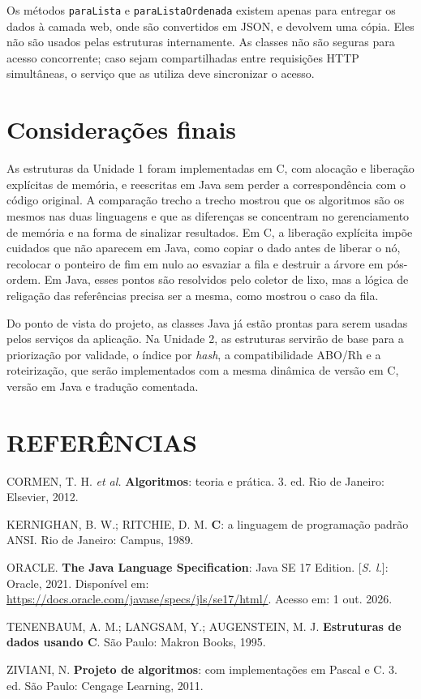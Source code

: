 \documentclass[12pt,a4paper,oneside]{report}
\newcommand{\cod}[1]{\texttt{#1}}
\begin{document}
Os métodos \cod{paraLista} e \cod{paraListaOrdenada} existem apenas para entregar os dados à camada web, onde são convertidos em JSON, e devolvem uma cópia. Eles não são usados pelas estruturas internamente. As classes não são seguras para acesso concorrente; caso sejam compartilhadas entre requisições HTTP simultâneas, o serviço que as utiliza deve sincronizar o acesso.

\chapter{Considerações finais}

As estruturas da Unidade 1 foram implementadas em C, com alocação e liberação explícitas de memória, e reescritas em Java sem perder a correspondência com o código original. A comparação trecho a trecho mostrou que os algoritmos são os mesmos nas duas linguagens e que as diferenças se concentram no gerenciamento de memória e na forma de sinalizar resultados. Em C, a liberação explícita impõe cuidados que não aparecem em Java, como copiar o dado antes de liberar o nó, recolocar o ponteiro de fim em nulo ao esvaziar a fila e destruir a árvore em pós-ordem. Em Java, esses pontos são resolvidos pelo coletor de lixo, mas a lógica de religação das referências precisa ser a mesma, como mostrou o caso da fila.

Do ponto de vista do projeto, as classes Java já estão prontas para serem usadas pelos serviços da aplicação. Na Unidade 2, as estruturas servirão de base para a priorização por validade, o índice por \textit{hash}, a compatibilidade ABO/Rh e a roteirização, que serão implementados com a mesma dinâmica de versão em C, versão em Java e tradução comentada.

\chapter*{REFERÊNCIAS}
\begin{singlespace}
\setlength{\parindent}{0pt}
\setlength{\parskip}{12pt}
\raggedright

CORMEN, T. H. \textit{et al.} \textbf{Algoritmos}: teoria e prática. 3. ed. Rio de Janeiro: Elsevier, 2012.

KERNIGHAN, B. W.; RITCHIE, D. M. \textbf{C}: a linguagem de programação padrão ANSI. Rio de Janeiro: Campus, 1989.

ORACLE. \textbf{The Java Language Specification}: Java SE 17 Edition. [\textit{S. l.}]: Oracle, 2021. Disponível em: \url{https://docs.oracle.com/javase/specs/jls/se17/html/}. Acesso em: 1 out. 2026.

TENENBAUM, A. M.; LANGSAM, Y.; AUGENSTEIN, M. J. \textbf{Estruturas de dados usando C}. São Paulo: Makron Books, 1995.

ZIVIANI, N. \textbf{Projeto de algoritmos}: com implementações em Pascal e C. 3. ed. São Paulo: Cengage Learning, 2011.
\end{singlespace}
\end{document}
